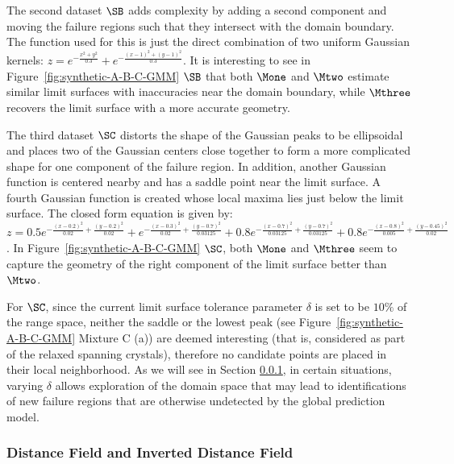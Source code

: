 The second dataset $\SB$ adds complexity by adding a second component and moving the failure regions such that they intersect with the domain boundary.
%
The function used for this is just the direct combination of two uniform Gaussian kernels:
$z = e^{-\frac{x^2+y^2}{0.3}} + e^{-\frac{(x-1)^2+(y-1)^2}{0.3}}$.
%
It is interesting to see in Figure~\ref{fig:synthetic-A-B-C-GMM} $\SB$ that both $\Mone$ and $\Mtwo$ estimate similar limit surfaces with inaccuracies near the domain boundary, while $\Mthree$ recovers the limit surface with a more accurate geometry.

The third dataset $\SC$ distorts the shape of the Gaussian peaks to be ellipsoidal and places two of the Gaussian centers close together to form a more complicated shape for one  component of the failure region.
%
In addition, another Gaussian function is centered nearby and has a saddle point near the limit surface.
%
A fourth Gaussian function is created whose local maxima lies just below the limit surface.
%
The closed form equation is given by:
$z = 0.5e^{-\frac{(x-0.2)^2}{0.02}+\frac{(y-0.2)^2}{0.02}}
   +    e^{-\frac{(x-0.3)^2}{0.02}+\frac{(y-0.7)^2}{0.03125}}
   + 0.8e^{-\frac{(x-0.7)^2}{0.03125}+\frac{(y-0.7)^2}{0.03125}}
   + 0.8e^{-\frac{(x-0.8)^2}{0.005}+\frac{(y-0.45)^2}{0.02}}$.
In Figure~\ref{fig:synthetic-A-B-C-GMM} $\SC$, both $\Mone$ and $\Mthree$ seem to capture the geometry of the right component of the limit surface better than $\Mtwo$.

For $\SC$, since the current limit surface tolerance parameter $\delta$ is set to be $10\%$ of the range space, neither the saddle or the lowest peak (see Figure~\ref{fig:synthetic-A-B-C-GMM} Mixture C (a)) are deemed interesting (that is, considered as part of the relaxed spanning crystals), therefore no candidate points are placed in their local neighborhood.
%
As we will see in Section \ref{subsec:df}, in certain situations, varying $\delta$ allows exploration of the domain space that may lead to identifications of new failure regions that are otherwise undetected by the global prediction model.


\subsubsection{Distance Field and Inverted Distance Field}
\label{subsec:df}

